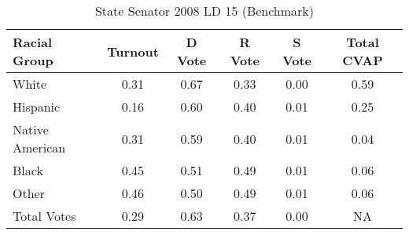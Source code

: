 \begin{table}[htb]
\begin{center}
\caption{State Senator 2008 LD 15 (Benchmark)}
\label{stsen08_cvap_ld_15_benchmark}
\begin{tabular}{lccccc}
  \hline
Racial Group & Turnout & D Vote & R Vote & S Vote & Total CVAP \\ 
  \hline
    White & 0.31  & 0.67  & 0.33  & 0.00  & 0.59 \\
    Hispanic & 0.16  & 0.60  & 0.40  & 0.01  & 0.25 \\
    Native American & 0.31  & 0.59  & 0.40  & 0.01  & 0.04 \\
    Black & 0.45  & 0.51  & 0.49  & 0.01  & 0.06 \\
    Other & 0.46  & 0.50  & 0.49  & 0.01  & 0.06 \\
    Total Votes & 0.29  & 0.63  & 0.37  & 0.00  &  NA \\
   \hline
\end{tabular}
\end{center}
\end{table}